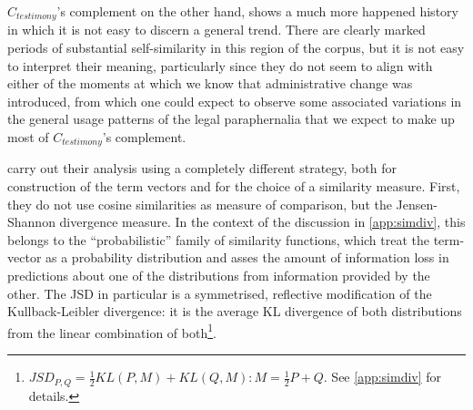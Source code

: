 $C_{testimony}$'s complement on the other hand, shows a much more happened history in which it is not easy to discern a general trend.
There are clearly marked periods of substantial self-similarity in this region of the corpus, but it is not easy to interpret their meaning, particularly since they do not seem to align with either of the moments at which we know that administrative change was introduced, from which one could expect to observe some associated variations in the general usage patterns of the legal paraphernalia that we expect to make up most of $C_{testimony}$'s complement.

\citet{klingenstein2014} carry out their analysis using a completely different strategy, both for construction of the term vectors and for the choice of a similarity measure.
First, they do not use cosine similarities as measure of comparison, but the Jensen-Shannon divergence measure.
In the context of the discussion in \autoref{app:simdiv}, this belongs to the ``probabilistic'' family of similarity functions, which treat the term-vector as a probability distribution and asses the amount of information loss in predictions about one of the distributions from information provided by the other.
The JSD in particular is a symmetrised, reflective modification of the Kullback-Leibler divergence: it is the average KL divergence of both distributions from the linear combination of both\footnote{
    $JSD_{P,Q} = \frac{1}{2} KL(P,M) + KL(Q,M) : M = \frac{1}{2} P + Q$.
    See \autoref{app:simdiv} for details.
}.


